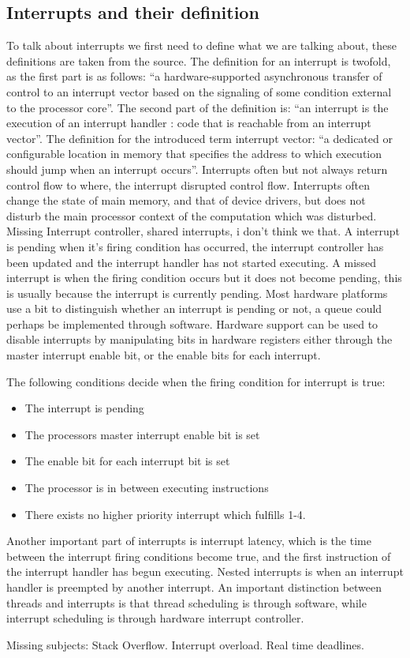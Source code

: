 \subsection{Interrupts and their definition}
\label{sec:Interrupts and their definition}
To talk about interrupts we first need to define what we are talking about, these definitions are taken from the source. The definition for an interrupt is twofold, as the first part is as follows: “a hardware-supported asynchronous transfer of control to an interrupt vector based on the signaling of some condition external to the processor core”. The second part of the definition is: “an interrupt is the execution of an interrupt handler : code that is reachable from an interrupt vector”. The definition for the introduced term interrupt vector: “a dedicated or configurable location in memory that specifies the address to which execution should jump when an interrupt occurs”. Interrupts often but not always return control flow to where, the interrupt disrupted control flow. Interrupts often change the state of main memory, and that of device drivers, but does not disturb the main processor context of the computation which was disturbed. Missing Interrupt controller, shared interrupts, i don't think we that. \newline
A interrupt is pending when it's firing condition has occurred, the interrupt controller has been updated and the interrupt handler has not started executing. A missed interrupt is when the firing condition occurs but it does not become pending, this is usually because the interrupt is currently pending. Most hardware platforms use a bit to distinguish whether an interrupt is pending or not, a queue could perhaps be implemented through software. Hardware support can be used to disable interrupts by manipulating bits in hardware registers either through the master interrupt enable bit, or the enable bits for each interrupt. 

The following conditions decide when the firing condition for interrupt is true:

\begin{itemize}
	\item The interrupt is pending
	\item The processors master interrupt enable bit is set
	\item The enable bit for each interrupt bit is set
	\item The processor is in between executing instructions
	\item There exists no higher priority interrupt which fulfills 1-4.
\end{itemize}

Another important part of interrupts is interrupt latency, which is the time between the interrupt firing conditions become true, and the first instruction of the interrupt handler has begun executing. Nested interrupts is when an interrupt handler is preempted by another interrupt. An important distinction between threads and interrupts is that thread scheduling is through software, while interrupt scheduling is through hardware interrupt controller.


Missing subjects: Stack Overflow. Interrupt overload. Real time deadlines.